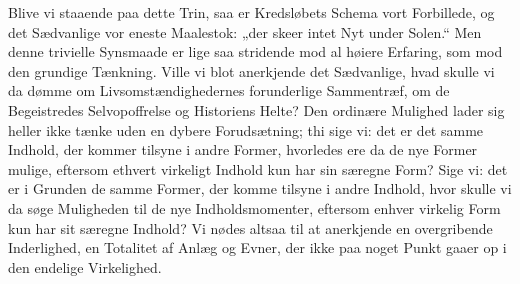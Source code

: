 \documentclass[12pt]{book}
\newcommand{\opage}[1]{\marginnote{\footnotesize\textit{[#1]}}}
\begin{document}
Blive vi staaende paa dette Trin, saa er Kredsløbets Schema vort Forbillede, og det
Sædvanlige vor eneste Maalestok: „der skeer intet Nyt under Solen.“ Men denne trivielle
Synsmaade er lige saa stridende mod al høiere Erfaring, som mod den grundige Tænkning. Ville
vi blot anerkjende det Sædvanlige, hvad skulle vi da dømme om Livsomstændighedernes
forunderlige Sammentræf, om de Begeistredes Selvopoffrelse og Historiens Helte? Den ordinære
Mulighed lader sig heller ikke tænke uden en dybere Forudsætning; thi sige vi: det er
\opage{154} det samme Indhold, der kommer tilsyne i andre Former, hvorledes ere da de nye Former mulige,
eftersom ethvert virkeligt Indhold kun har sin særegne Form? Sige vi: det er i Grunden de
samme Former, der komme tilsyne i andre Indhold, hvor skulle vi da søge Muligheden til de nye
Indholdsmomenter, eftersom enhver virkelig Form kun har sit særegne Indhold? Vi nødes altsaa
til at anerkjende en overgribende Inderlighed, en Totalitet af Anlæg og Evner, der ikke paa
noget Punkt gaaer op i den endelige Virkelighed.
\end{document}
